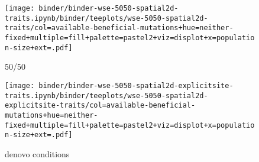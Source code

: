\begin{sidewaysfigure}[h]
  \rotatesidewayslabel
    \begin{subfigure}[b]{0.47\linewidth}
        \begin{minipage}{\textwidth}
          \texttt{[image: binder/binder-wse-5050-spatial2d-traits.ipynb/binder/teeplots/wse-5050-spatial2d-traits/col=available-beneficial-mutations+hue=neither-fixed+multiple=fill+palette=pastel2+viz=displot+x=population-size+ext=.pdf]}%
        \end{minipage}
        \begin{minipage}{\textwidth}
        \caption{50/50}
        \label{fig:neither-fixed-wse:5050}
        \end{minipage}%
    \end{subfigure}%
    \begin{subfigure}[b]{0.53\linewidth}
        \begin{minipage}{\textwidth}
          \texttt{[image: binder/binder-wse-5050-spatial2d-explicitsite-traits.ipynb/binder/teeplots/wse-5050-spatial2d-explicitsite-traits/col=available-beneficial-mutations+hue=neither-fixed+multiple=fill+palette=pastel2+viz=displot+x=population-size+ext=.pdf]}%
        \end{minipage}
        \begin{minipage}{\textwidth}
        \caption{denovo conditions}
        \label{fig:neither-fixed-wse:5050-explicitsite}
        \end{minipage}%
    \end{subfigure}


\end{sidewaysfigure}
